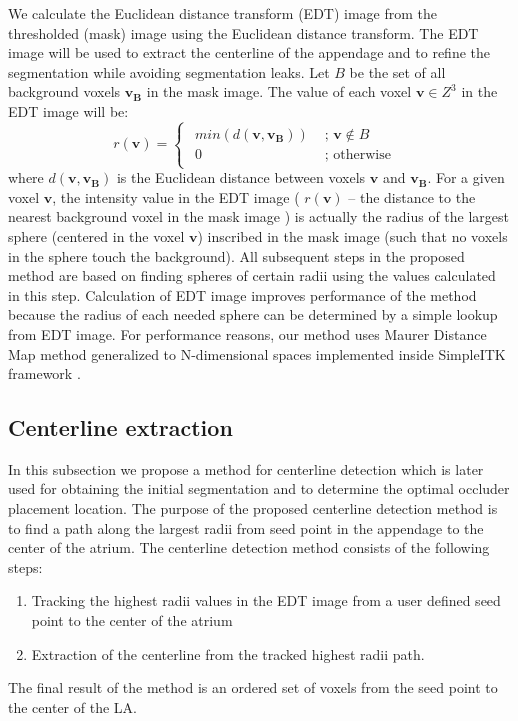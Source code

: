 \documentclass[review]{elsarticle}
\renewcommand{\vec}[1]{\mathbf{#1}} %
\begin{document}
We calculate the  Euclidean distance transform (EDT) image
from the thresholded (mask) image using the
Euclidean distance transform. The EDT image will be used to extract the
centerline of the appendage and to refine the segmentation while avoiding
segmentation leaks.  Let $B$ be the set of all background voxels $\mathbf{v_B}$
in the mask image.
The value of each voxel $\textbf{v} \in {Z}^3$ in the
EDT image will be:
\begin{equation}
  r\left(\mathbf{v}\right) = \left\{
    \begin{matrix}
      \begin{split}
        min(d(\mathbf{v},\mathbf{v_B})) & \textrm{ ;   } \mathbf{v} \notin B \\
        0 & \textrm{ ;   otherwise }
      \end{split}
    \end{matrix}\right. 
  \label{eq:radius}
\end{equation}
where $d(\mathbf{v}, \mathbf{v_B})$ is the Euclidean distance between voxels
$\mathbf{v}$ and $\mathbf{v_B}$.  
  For a given voxel $\vec{v}$, the intensity value in the EDT image ( $r(\vec{v})$ -- 
  the distance to the nearest background voxel in the mask image ) is actually the radius of the largest 
  sphere (centered in the voxel $\vec{v}$) inscribed in the mask image (such that no voxels
  in the sphere touch the background).
  All subsequent steps in the proposed method are based on finding spheres of certain
  radii using the values calculated in this step.
Calculation of  EDT image
improves performance of the method 
because the radius of each needed sphere can
be determined by a simple lookup from EDT image.  For performance reasons,
our method uses Maurer Distance Map
method \cite{maurer2003_LinearTimeAlgorithm} generalized to N-dimensional
spaces implemented inside SimpleITK framework
\cite{lowekamp2013_DesignSimpleITK}.  


\subsection{Centerline extraction}
\label{sec:centerline}



In this subsection we propose a method for centerline detection which is later
used for obtaining the initial segmentation and to determine the optimal
occluder placement location.  The purpose of the proposed centerline detection
method is to find a path along the largest radii from seed point in the
appendage to the center of the atrium.  The centerline detection method
consists of the following steps: 
\begin{enumerate}
  \item Tracking the highest radii values in the EDT image from a user
    defined seed point to the center of the atrium
  \item Extraction of the centerline from the tracked highest radii path. 
\end{enumerate}
  The final result of the method is an ordered set of voxels from the seed point 
  to the center of the LA.
\end{document}
